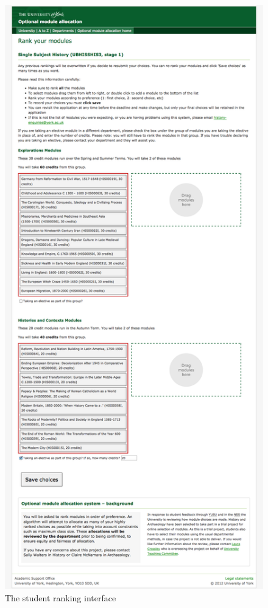 \begin{landscape}
  \begin{figure}
    \begin{minipage}{0.49\linewidth}
      \centering
      \includegraphics[width=0.6\linewidth]{images/walkthrough/student_rank_modules.png}
      \caption{The student ranking interface}
      \label{walkthrough_student_rank}
    \end{minipage}
    \begin{minipage}{0.48\linewidth}
      \centering

\end{minipage}
\end{figure}
\end{landscape}

